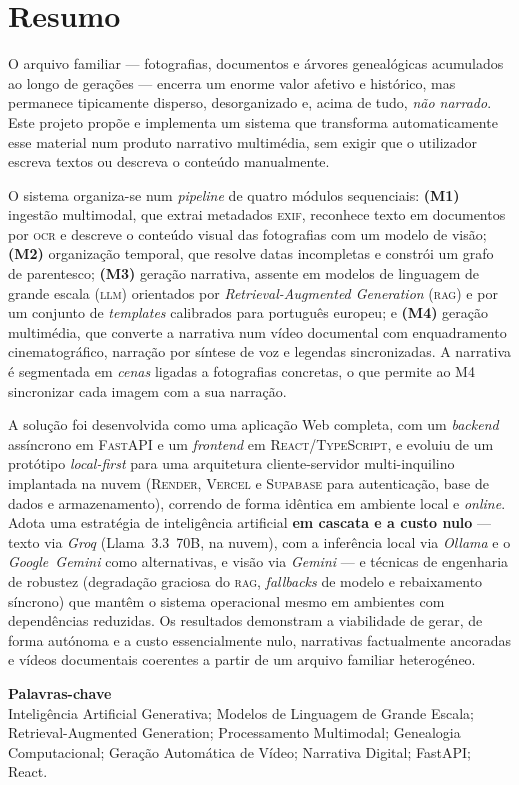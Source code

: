 \chapter*{Resumo}

O arquivo familiar — fotografias, documentos e árvores genealógicas
acumulados ao longo de gerações — encerra um enorme valor afetivo e
histórico, mas permanece tipicamente disperso, desorganizado e, acima de
tudo, \emph{não narrado}. Este projeto propõe e implementa um sistema que
transforma automaticamente esse material num produto narrativo
multimédia, sem exigir que o utilizador escreva textos ou descreva o
conteúdo manualmente.

O sistema organiza-se num \emph{pipeline} de quatro módulos sequenciais:
\textbf{(M1)} ingestão multimodal, que extrai metadados \textsc{exif},
reconhece texto em documentos por \textsc{ocr} e descreve o conteúdo
visual das fotografias com um modelo de visão; \textbf{(M2)} organização
temporal, que resolve datas incompletas e constrói um grafo de
parentesco; \textbf{(M3)} geração narrativa, assente em modelos de
linguagem de grande escala (\textsc{llm}) orientados por
\emph{Retrieval-Augmented Generation} (\textsc{rag}) e por um conjunto de
\emph{templates} calibrados para português europeu; e \textbf{(M4)}
geração multimédia, que converte a narrativa num vídeo documental com
enquadramento cinematográfico, narração por síntese de voz e legendas
sincronizadas. A narrativa é segmentada em \emph{cenas} ligadas a
fotografias concretas, o que permite ao M4 sincronizar cada imagem com a
sua narração.

A solução foi desenvolvida como uma aplicação Web completa, com um
\emph{backend} assíncrono em \textsc{FastAPI} e um \emph{frontend} em
\textsc{React}/\textsc{TypeScript}, e evoluiu de um protótipo
\emph{local-first} para uma arquitetura cliente-servidor multi-inquilino
implantada na nuvem (\textsc{Render}, \textsc{Vercel} e \textsc{Supabase}
para autenticação, base de dados e armazenamento), correndo de forma
idêntica em ambiente local e \emph{online}. Adota uma estratégia de
inteligência artificial \textbf{em cascata e a custo nulo} — texto via
\emph{Groq} (Llama~3.3~70B, na nuvem), com a inferência local via
\emph{Ollama} e o \emph{Google~Gemini} como alternativas, e visão via
\emph{Gemini} — e técnicas de engenharia de robustez (degradação graciosa
do \textsc{rag}, \emph{fallbacks} de modelo e rebaixamento síncrono) que
mantêm o sistema operacional mesmo em ambientes com dependências
reduzidas. Os resultados
demonstram a viabilidade de gerar, de forma autónoma e a custo
essencialmente nulo, narrativas factualmente ancoradas e vídeos
documentais coerentes a partir de um arquivo familiar heterogéneo.

\vspace{0.8cm}
\noindent\textbf{Palavras-chave}\\[0.2cm]
Inteligência Artificial Generativa; Modelos de Linguagem de Grande
Escala; Retrieval-Augmented Generation; Processamento Multimodal;
Genealogia Computacional; Geração Automática de Vídeo; Narrativa Digital;
FastAPI; React.

